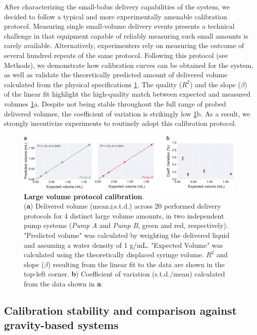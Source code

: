 After characterizing the small-bolus delivery capabilities of the system, we decided to follow a typical and more experimentally amenable calibration protocol. Measuring single small-volume delivery events presents a technical challenge in that equipment capable of reliably measuring such small amounts is rarely available. Alternatively, experimenters rely on measuring the outcome of several hundred repeats of the same protocol. Following this protocol (see Methods), we demonstrate how calibration curves can be obtained for the system, as well as validate the theoretically predicted amount of delivered volume calculated from the physical specifications \cref{fig:LargeVolumeCalibration}. The quality ($R^2$) and the slope ($\beta$) of the linear fit highlight the high-quality match between expected and measured volumes \cref{fig:LargeVolumeCalibration}a. Despite not being stable throughout the full range of probed delivered volumes, the coefficient of variation is strikingly low \cref{fig:LargeVolumeCalibration}b. As a result, we strongly incentivize experiments to routinely adopt this calibration protocol.

\begin{figure}[ht] 
	\centering
	\includegraphics[width=1.0\linewidth]{Figures/Artboard 6.pdf}
	\caption{\textbf{Large volume protocol calibration}.\\
		(\textbf{a}) Delivered volume (mean$\pm$s.t.d.) across 20 performed delivery protocols for 4 distinct large volume amounts, in two independent pump systems (\textit{Pump A} and \textit{Pump B}, green and red, respectively). "Predicted volume" was calculated by weighting the delivered liquid and assuming a water density of 1 g/mL. "Expected Volume" was calculated using the theoretically displaced syringe volume.  $R^{2}$ and slope ($\beta$) resulting from the linear fit to the data are shown in the top-left corner. \textbf{b}) Coefficient of variation (s.t.d./mean) calculated from the data shown in \textbf{a}.}
	\label{fig:LargeVolumeCalibration} 
\end{figure}

\subsection*{Calibration stability and comparison against gravity-based systems}

